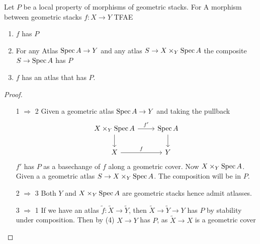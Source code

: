 \documentclass{article}
\begin{document}
\begin{lemma}
    Let $P$ be a local property of morphisms of geometric stacks. For
    A morphism between geometric stacks $f : X \to Y$  TFAE 
    \begin{enumerate}
    	\item $f$ has $P$

    	\item For any Atlas $\operatorname{Spec} A \to Y$ and any atlas $S \to X \times_Y \operatorname{Spec} A$ the composite $S \to \operatorname{Spec} A$ has $P$
	    \item $f$ has an atlas that has $P$.
    \end{enumerate}
\end{lemma}
\begin{proof}
\begin{itemize}
	\item [1 $\Rightarrow$ 2]
	Given a geometric atlas $\operatorname{Spec} A \to Y$ and taking the pullback %
	\[\begin{tikzcd}
		{X \times_Y \Spec A} & {\Spec A} \\
		X & Y
		\arrow["{f'}", from=1-1, to=1-2]
		\arrow[from=1-1, to=2-1]
		\arrow[from=1-2, to=2-2]
		\arrow["f", from=2-1, to=2-2]
	\end{tikzcd}\]
$f'$ has $P$ as a basechange of $f$ along a geometric cover. Now $X \times_Y \operatorname{Spec} A$. Given a a geometric atlas $S \to X \times_Y \operatorname{Spec} A$. The composition will be in $P$.
\item [2 $\Rightarrow$ 3]
Both $Y$ and $X \times_Y \operatorname{Spec} A$ are geometric stacks hence admit atlasses.
\item [3 $\Rightarrow$ 1]
	If we have an atlas $\tilde f : \tilde X \to \tilde Y$, then $\tilde X \to \tilde Y \to Y$ has $P$ by stability under composition. Then by (4) $X \to Y$ has $P$, as $\tilde X \to X$ is a geometric cover \\

\end{itemize}
\end{proof}
\end{document}

